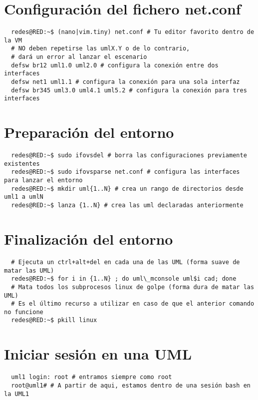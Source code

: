 \documentclass{article}
\begin{document}
\tableofcontents
\newpage

\section{Configuración del fichero net.conf}
\begin{verbatim}
  redes@RED:~$ (nano|vim.tiny) net.conf # Tu editor favorito dentro de la VM
  # NO deben repetirse las umlX.Y o de lo contrario,
  # dará un error al lanzar el escenario
  defsw br12 uml1.0 uml2.0 # configura la conexión entre dos interfaces
  defsw net1 uml1.1 # configura la conexión para una sola interfaz
  defsw br345 uml3.0 uml4.1 uml5.2 # configura la conexión para tres interfaces
\end{verbatim}

\section{Preparación del entorno}
\begin{verbatim}
  redes@RED:~$ sudo ifovsdel # borra las configuraciones previamente existentes
  redes@RED:~$ sudo ifovsparse net.conf # configura las interfaces para lanzar el entorno
  redes@RED:~$ mkdir uml{1..N} # crea un rango de directorios desde uml1 a umlN
  redes@RED:~$ lanza {1..N} # crea las uml declaradas anteriormente
\end{verbatim}

\section{Finalización del entorno}
\begin{verbatim}
  # Ejecuta un ctrl+alt+del en cada una de las UML (forma suave de matar las UML)
  redes@RED:~$ for i in {1..N} ; do uml\_mconsole uml$i cad; done
  # Mata todos los subprocesos linux de golpe (forma dura de matar las UML)
  # Es el último recurso a utilizar en caso de que el anterior comando no funcione
  redes@RED:~$ pkill linux
\end{verbatim}

\section{Iniciar sesión en una UML}
\begin{verbatim}
  uml1 login: root # entramos siempre como root
  root@uml1# # A partir de aqui, estamos dentro de una sesión bash en la UML1
\end{verbatim}
\end{document}
